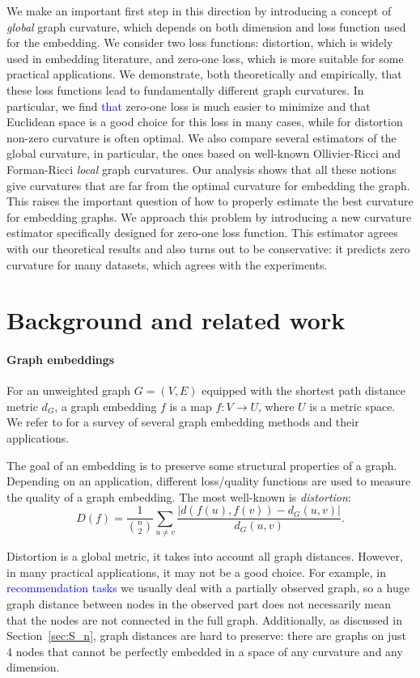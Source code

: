 \documentclass{article} %
\newcommand{\ph}[1]{\textcolor{blue}{#1}}
\begin{document}
We make an important first step in this direction by introducing a concept of \textit{global} graph curvature, which depends on both dimension and loss function used for the embedding. We consider two loss functions: distortion, which is widely used in embedding literature, and zero-one loss, which is more suitable for some practical applications. We demonstrate, both theoretically and empirically, that these loss functions lead to fundamentally different graph curvatures. 
In particular, we find \ph{that} zero-one loss is much easier to minimize and that Euclidean space is a good choice for this loss in many cases, while for distortion non-zero curvature is often optimal.
We also compare several estimators of the global curvature, in particular, the ones based on well-known Ollivier-Ricci and Forman-Ricci \textit{local} graph curvatures. Our analysis shows that all these notions give curvatures that are far from the optimal curvature for embedding the graph. This raises the important question of how to properly estimate the best curvature for embedding graphs. 
We approach this problem by introducing a new curvature estimator specifically designed for zero-one loss function. This estimator agrees with our theoretical results and also turns out to be conservative: it predicts zero curvature for many datasets, which agrees with the experiments.

\section{Background and related work}\label{sec:related_work}

\paragraph{Graph embeddings} 
For an unweighted graph $G = (V,E)$ equipped with the shortest path distance metric $d_G$, a graph embedding $f$ is a map $f: V \rightarrow U$, where $U$ is a metric space.
We refer to \cite{goyal2018graph} for a survey of several graph embedding methods and their applications. 

The goal of an embedding is to preserve some structural properties of a graph.
Depending on an application, different loss/quality functions are used to measure the quality of a graph embedding. The most well-known is \textit{distortion}:
\[
D(f) = \frac{1}{\binom{n}{2}} \sum_{u \neq v}  \frac{|d(f(u),f(v)) - d_G(u,v)|}{d_G(u,v)}.
\]

Distortion is a global metric, it takes into account all graph distances. However, in many practical applications, it may not be a good choice. For example, in \ph{recommendation tasks} we usually deal with a partially observed graph, so a huge graph distance between nodes in the observed part does not necessarily mean that the nodes are not connected in the full graph. Additionally, as discussed in Section~\ref{sec:S_n}, graph distances are hard to preserve: there are graphs on just 4 nodes that cannot be perfectly embedded in a space of any curvature and any dimension. 
\end{document}
